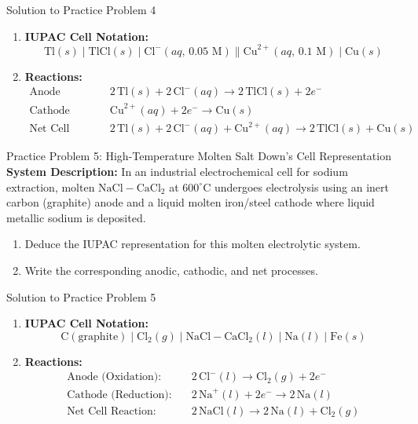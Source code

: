 \documentclass[10pt,a4paper]{article}
\begin{document}
\begin{solutionbox}{Solution to Practice Problem 4}
\begin{enumerate}[label=(\alph*)]
    \item \textbf{IUPAC Cell Notation:}
    $$\text{Tl}(s) \mid \text{TlCl}(s) \mid \text{Cl}^-(aq,\, 0.05\text{ M}) \parallel \text{Cu}^{2+}(aq,\, 0.1\text{ M}) \mid \text{Cu}(s)$$
    \item \textbf{Reactions:}
    \begin{align*}
        \text{Anode (Oxidation):} \quad & 2\,\text{Tl}(s) + 2\,\text{Cl}^-(aq) \longrightarrow 2\,\text{TlCl}(s) + 2e^- \\
        \text{Cathode (Reduction):} \quad & \text{Cu}^{2+}(aq) + 2e^- \longrightarrow \text{Cu}(s) \\
        \text{Net Cell Reaction:} \quad & 2\,\text{Tl}(s) + 2\,\text{Cl}^-(aq) + \text{Cu}^{2+}(aq) \longrightarrow 2\,\text{TlCl}(s) + \text{Cu}(s)
    \end{align*}
\end{enumerate}
\end{solutionbox}

\begin{exercisebox}{Practice Problem 5: High-Temperature Molten Salt Down's Cell Representation}
\textbf{System Description:}
In an industrial electrochemical cell for sodium extraction, molten $\text{NaCl}-\text{CaCl}_2$ at $600^\circ\text{C}$ undergoes electrolysis using an inert carbon (graphite) anode and a liquid molten iron/steel cathode where liquid metallic sodium is deposited.
\begin{enumerate}[label=(\alph*)]
    \item Deduce the IUPAC representation for this molten electrolytic system.
    \item Write the corresponding anodic, cathodic, and net processes.
\end{enumerate}
\end{exercisebox}

\begin{solutionbox}{Solution to Practice Problem 5}
\begin{enumerate}[label=(\alph*)]
    \item \textbf{IUPAC Cell Notation:}
    $$\text{C}(\text{graphite}) \mid \text{Cl}_2(g) \mid \text{NaCl}-\text{CaCl}_2(l) \mid \text{Na}(l) \mid \text{Fe}(s)$$
    \item \textbf{Reactions:}
    \begin{align*}
        \text{Anode (Oxidation):} \quad & 2\,\text{Cl}^-(l) \longrightarrow \text{Cl}_2(g) + 2e^- \\
        \text{Cathode (Reduction):} \quad & 2\,\text{Na}^+(l) + 2e^- \longrightarrow 2\,\text{Na}(l) \\
        \text{Net Cell Reaction:} \quad & 2\,\text{NaCl}(l) \longrightarrow 2\,\text{Na}(l) + \text{Cl}_2(g)
    \end{align*}
\end{enumerate}
\end{solutionbox}
\end{document}
